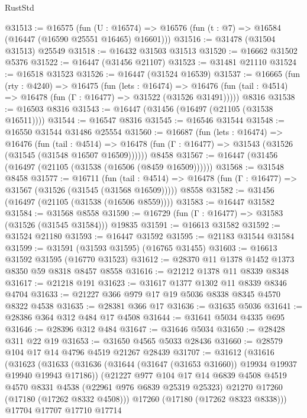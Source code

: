 \begin{lexlean}{RustStd}
\begin{coremodule}
@31513 := @16575
    (fun (U : @16574) => @16576 (fun (t : @7) => @16584 (@16447 (@16590 @25551 @16465) @16601)))
@31516 := @31478 (@31504 @31513) @25549
@31518 := @16432 @31503 @31513
@31520 := @16662 @31502 @5376
@31522 := @16447 (@31456 @21107)
@31523 := @31481 @21110
@31524 := @16518 @31523
@31526 := @16447 (@31524 @16539)
@31537 := @16665
    (fun (rty : @4240) =>
    @16475
      (fun (lets : @16474) =>
      @16476 (fun (tail : @4514) => @16478 (fun (Γ : @16477) => @31522 (@31526 @31491)))))
    @8316
@31538 := @16503 @8316
@31543 := @16447 (@31456 (@16497 (@21105 (@31538 @16511))))
@31544 := @16547 @8316
@31545 := @16546 @31544
@31548 := @16550 @31544 @31486 @25554
@31560 := @16687
    (fun (lets : @16474) =>
    @16476
      (fun (tail : @4514) =>
      @16478 (fun (Γ : @16477) => @31543 (@31526 (@31545 (@31548 @16507 @16509))))))
    @8458
@31567 := @16447 (@31456 (@16497 (@21105 (@31538 (@16506 (@8459 @16509))))))
@31568 := @31548 @8458
@31577 := @16711
    (fun (tail : @4514) => @16478 (fun (Γ : @16477) => @31567 (@31526 (@31545 (@31568 @16509)))))
    @8558
@31582 := @31456 (@16497 (@21105 (@31538 (@16506 @8559))))
@31583 := @16447 @31582
@31584 := @31568 @8558
@31590 := @16729 (fun (Γ : @16477) => @31583 (@31526 (@31545 @31584))) @19835
@31591 := @16613 @31582
@31592 := @31524 @21180
@31593 := @16447 @31592
@31595 := @21183 @31544 @31584
@31599 := @31591 (@31593 @31595) (@16765 @31455)
@31603 := @16613 @31592 @31595 (@16770 @31523)
@31612 := @28370 @11 @1378 @1452 @1373 @8350 @59 @8318 @8457 @8558
@31616 := @21212 @1378 @11 @8339 @8348
@31617 := @21218 @191
@31623 := @31617 @1377 @1302 @11 @8339 @8346 @4704
@31633 := @21227 @366 @979 @17 @19 @5036 @8338 @8345 @4570 @8322 @4538
@31635 := @28381 @366 @17
@31636 := @31635 @5036
@31641 := @28386 @364 @312 @484 @17 @4508
@31644 := @31641 @5034 @4335 @695
@31646 := @28396 @312 @484
@31647 := @31646 @5034
@31650 := @28428 @311 @22 @19
@31653 := @31650 @4565 @5033 @28436
@31660 := @28579 @104 @17 @14 @4796 @4519 @21267 @28439
@31707 := @31612
    (@31616
      (@31623
        (@31633
          (@31636 (@31644 (@31647 (@31653 @31660)) @19934 @19937 @19940 @19943 @17186))
          (@21227
            @977
            @104
            @17
            @14
            @6839
            @4508
            @4519
            @4570
            @8331
            @4538
            (@22961 @976 @6839 @25319 @25323)
            @21270
            @17260
            (@17180 (@17262 @8332 @4508)))
          @17260
          (@17180 (@17262 @8323 @8338)))
        @17704
        @17707
        @17710
        @17714

\end{coremodule}
\end{lexlean}
